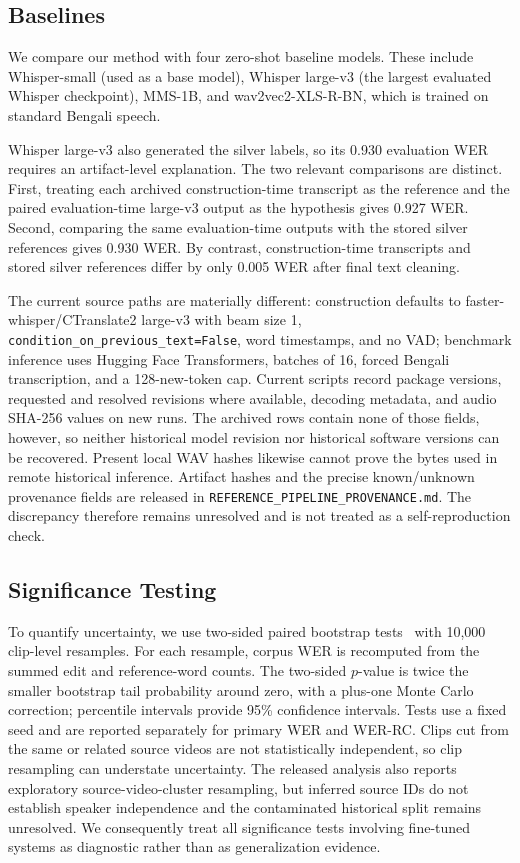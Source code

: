 \documentclass[journal]{IEEEtran}
\begin{document}
\subsection{Baselines}

We compare our method with four zero-shot baseline models. These include
Whisper-small (used as a base model), Whisper large-v3 (the largest evaluated
Whisper checkpoint), MMS-1B, and wav2vec2-XLS-R-BN, which is trained on standard
Bengali speech.

Whisper large-v3 also generated the silver labels, so its 0.930 evaluation WER
requires an artifact-level explanation. The two relevant comparisons are
distinct. First, treating each archived construction-time transcript as the
reference and the paired evaluation-time large-v3 output as the hypothesis
gives 0.927 WER. Second, comparing the same evaluation-time outputs with the
stored silver references gives 0.930 WER. By contrast, construction-time
transcripts and stored silver references differ by only 0.005 WER after final
text cleaning.

The current source paths are materially different: construction defaults to
faster-whisper/CTranslate2 large-v3 with beam size 1,
\texttt{condition\_on\_previous\_text=False}, word timestamps, and no VAD;
benchmark inference uses Hugging Face Transformers, batches of 16, forced
Bengali transcription, and a 128-new-token cap. Current scripts record package
versions, requested and resolved revisions where available, decoding metadata,
and audio SHA-256 values on new runs. The archived rows contain none of those
fields, however, so neither historical model revision nor historical software
versions can be recovered. Present local WAV hashes likewise cannot prove the
bytes used in remote historical inference. Artifact hashes and the precise
known/unknown provenance fields are released in
\texttt{REFERENCE\_PIPELINE\_PROVENANCE.md}. The discrepancy therefore remains
unresolved and is not treated as a self-reproduction check.

\subsection{Significance Testing}

To quantify uncertainty, we use two-sided paired bootstrap tests~\cite{berg2012empirical} with 10{,}000 clip-level resamples. For each resample, corpus WER is recomputed from the summed edit and reference-word counts. The two-sided $p$-value is twice the smaller bootstrap tail probability around zero, with a plus-one Monte Carlo correction; percentile intervals provide 95\% confidence intervals. Tests use a fixed seed and are reported separately for primary WER and WER-RC. Clips cut from the same or related source videos are not statistically independent, so clip resampling can understate uncertainty. The released analysis also reports exploratory source-video-cluster resampling, but inferred source IDs do not establish speaker independence and the contaminated historical split remains unresolved. We consequently treat all significance tests involving fine-tuned systems as diagnostic rather than as generalization evidence.
\end{document}
